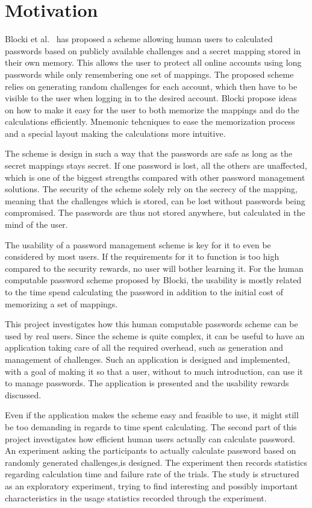 \section{Motivation}
Blocki et al.~\cite{Blocki2014,hcp-blocki} has proposed a scheme allowing human users to calculated passwords based on publicly available challenges and a secret mapping stored in their own memory. This allows the user to protect all online accounts using long passwords while only remembering one set of mappings. The proposed scheme relies on generating random challenges for each account, which then have to be visible to the user when logging in to the desired account. Blocki propose ideas on how to make it easy for the user to both memorize the mappings and do the calculations efficiently. Mnemonic tehcniques to ease the memorization process and a special layout making the calculations more intuitive.
\par The scheme is design in such a way that the passwords are safe as long as the secret mappings stays secret. If one password is lost, all the others are unaffected, which is one of the biggest strengths compared with other password management solutions. The security of the scheme solely rely on the secrecy of the mapping, meaning that the challenges which is stored, can be lost without passwords being compromised. The passwords are thus not stored anywhere, but calculated in the mind of the user. 
\par The usability of a password management scheme is key for it to even be considered by most users. If the requirements for it to function is too high compared to the security rewards, no user will bother learning it. For the human computable password scheme proposed by Blocki, the usability is mostly related to the time spend calculating the password in addition to the initial cost of memorizing a set of mappings.
\par This project investigates how this human computable passwords scheme can be used by real users. Since the scheme is quite complex, it can be useful to have an application taking care of all the required overhead, such as generation and management of challenges. Such an application is designed and implemented, with a goal of making it so that a user, without to much introduction, can use it to manage passwords. The application is presented and the usability rewards discussed.
\par Even if the application makes the scheme easy and feasible to use, it might still be too demanding in regards to time spent calculating. The second part of this project investigates how efficient human users actually can calculate password. An experiment asking the participants to actually calculate password based on randomly generated challenges,is designed. The experiment then records statistics regarding calculation time and failure rate of the trials. The study is structured as an exploratory experiment, trying to find interesting and possibly important characteristics in the usage statistics recorded through the experiment.

